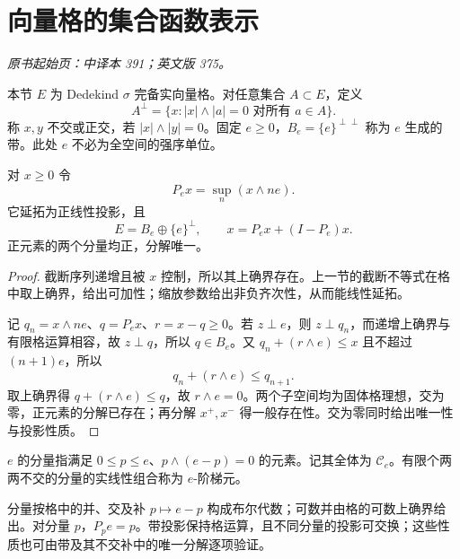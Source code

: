 \section{向量格的集合函数表示}\label{sec:yosida-12-06}
\noindent\textit{原书起始页：中译本 391；英文版 375。}

本节 $E$ 为 Dedekind $\sigma$ 完备实向量格。对任意集合 $A\subset E$，定义
\[
 A^\perp=\{x:|x|\wedge|a|=0\text{ 对所有 }a\in A\}.
\]
称 $x,y$ 不交或正交，若 $|x|\wedge|y|=0$。固定 $e\ge0$，$B_e=\{e\}^{\perp\perp}$ 称为 $e$ 生成的带。此处 $e$ 不必为全空间的强序单位。

\begin{theorem}\label{thm:y12-band-projection}
对 $x\ge0$ 令
\[
 P_ex=\sup_n(x\wedge ne).
\]
它延拓为正线性投影，且
\[
 E=B_e\oplus\{e\}^\perp,\qquad x=P_ex+(I-P_e)x.
\]
正元素的两个分量均正，分解唯一。
\end{theorem}
\begin{proof}
截断序列递增且被 $x$ 控制，所以其上确界存在。上一节的截断不等式在格中取上确界，给出可加性；缩放参数给出非负齐次性，从而能线性延拓。

记 $q_n=x\wedge ne$、$q=P_ex$、$r=x-q\ge0$。若 $z\perp e$，则 $z\perp q_n$，而递增上确界与有限格运算相容，故 $z\perp q$，所以 $q\in B_e$。又 $q_n+(r\wedge e)\le x$ 且不超过 $(n+1)e$，所以
\[
 q_n+(r\wedge e)\le q_{n+1}.
\]
取上确界得 $q+(r\wedge e)\le q$，故 $r\wedge e=0$。两个子空间均为固体格理想，交为零，正元素的分解已存在；再分解 $x^+,x^-$ 得一般存在性。交为零同时给出唯一性与投影性质。
\end{proof}

\begin{definition}[分量与阶梯元]
$e$ 的分量指满足 $0\le p\le e$、$p\wedge(e-p)=0$ 的元素。记其全体为 $\mathcal C_e$。有限个两两不交的分量的实线性组合称为 $e$-阶梯元。
\end{definition}

分量按格中的并、交及补 $p\mapsto e-p$ 构成布尔代数；可数并由格的可数上确界给出。对分量 $p$，$P_pe=p$。带投影保持格运算，且不同分量的投影可交换；这些性质也可由带及其不交补中的唯一分解逐项验证。


